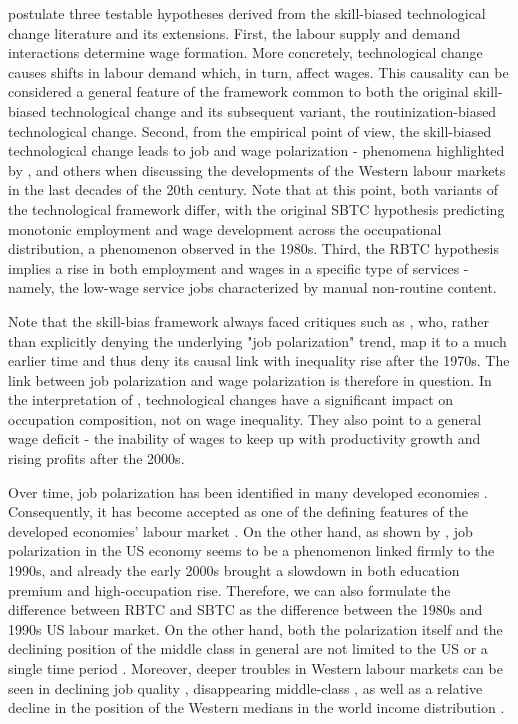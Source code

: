 \documentclass[11pt]{article}
\begin{document}
\citet{mishel2013assessing} postulate three testable hypotheses derived from the skill-biased technological change literature and its extensions. First, the labour supply and demand interactions determine wage formation. More concretely, technological change causes shifts in labour demand which, in turn, affect wages. This causality can be considered a general feature of the framework common to both the original skill-biased technological change and its subsequent variant, the routinization-biased technological change. Second, from the empirical point of view, the skill-biased technological change leads to job and wage polarization - phenomena highlighted by \citet{acemoglu2012does}, \citet{howell2019declining} and others when discussing the developments of the Western labour markets in the last decades of the 20th century. Note that at this point, both variants of the technological framework differ, with the original SBTC hypothesis predicting monotonic employment and wage development across the occupational distribution, a phenomenon observed in the 1980s. Third, the RBTC hypothesis implies a rise in both employment and wages in a specific type of services - namely, the low-wage service jobs characterized by manual non-routine content.

Note that the skill-bias framework always faced critiques such as \citet{mishel2013assessing}, who, rather than explicitly denying the underlying "job polarization" trend, map it to a much earlier time and thus deny its causal link with inequality rise after the 1970s. The link between job polarization and wage polarization is therefore in question. In the interpretation of \citeauthor{mishel2013assessing}, technological changes have a significant impact on occupation composition, not on wage inequality. They also point to a general wage deficit - the inability of wages to keep up with productivity growth and rising profits after the 2000s.

 Over time, job polarization has been identified in many developed economies \citep{rodrik2020economic, oecd2017}. Consequently, it has become accepted as one of the defining features of the developed economies' labour market \citep{howell2019declining}. On the other hand, as shown by \citet{mishel2013assessing}, job polarization in the US economy seems to be a phenomenon linked firmly to the 1990s, and already the early 2000s brought a slowdown in both education premium and high-occupation rise. Therefore, we can also formulate the difference between RBTC and SBTC as the difference between the 1980s and 1990s US labour market. On the other hand, both the polarization itself and the declining position of the middle class in general are not limited to the US or a single time period \citep{temin2018vanishing, rodrik2020economic}. Moreover, deeper troubles in Western labour markets can be seen in declining job quality \citep{howell2019declining}, disappearing middle-class \citep{temin2018vanishing}, as well as a relative decline in the position of the Western medians in the world income distribution \citep{milanovic2020elephant}.
\end{document}
